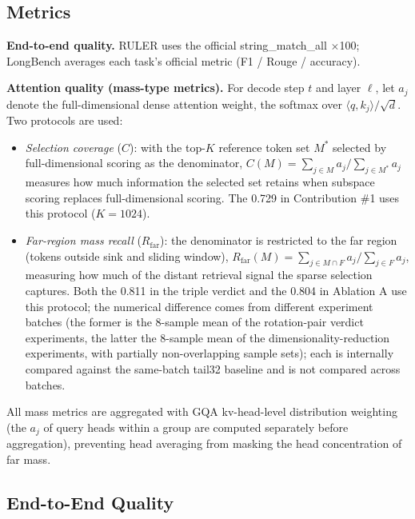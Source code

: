\documentclass[11pt]{article}
\begin{document}
\subsection{Metrics}

\textbf{End-to-end quality.} RULER uses the official string\_match\_all $\times$100; LongBench averages each task's official metric (F1 / Rouge / accuracy).

\textbf{Attention quality (mass-type metrics).} For decode step $t$ and layer $\ell$, let $a_j$ denote the full-dimensional dense attention weight, the softmax over $\langle q, k_j \rangle / \sqrt{d}$. Two protocols are used:
\begin{itemize}
\item \emph{Selection coverage} ($C$): with the top-$K$ reference token set $M^\ast$ selected by full-dimensional scoring as the denominator, $C(M) = \sum_{j \in M} a_j / \sum_{j \in M^\ast} a_j$ measures how much information the selected set retains when subspace scoring replaces full-dimensional scoring. The 0.729 in Contribution \#1 uses this protocol ($K{=}1024$).
\item \emph{Far-region mass recall} ($R_{\mathrm{far}}$): the denominator is restricted to the far region (tokens outside sink and sliding window), $R_{\mathrm{far}}(M) = \sum_{j \in M \cap F} a_j / \sum_{j \in F} a_j$, measuring how much of the distant retrieval signal the sparse selection captures. Both the 0.811 in the triple verdict and the 0.804 in Ablation A use this protocol; the numerical difference comes from different experiment batches (the former is the 8-sample mean of the rotation-pair verdict experiments, the latter the 8-sample mean of the dimensionality-reduction experiments, with partially non-overlapping sample sets); each is internally compared against the same-batch tail32 baseline and is not compared across batches.
\end{itemize}
All mass metrics are aggregated with GQA kv-head-level distribution weighting (the $a_j$ of query heads within a group are computed separately before aggregation), preventing head averaging from masking the head concentration of far mass.

\subsection{End-to-End Quality}
\end{document}
